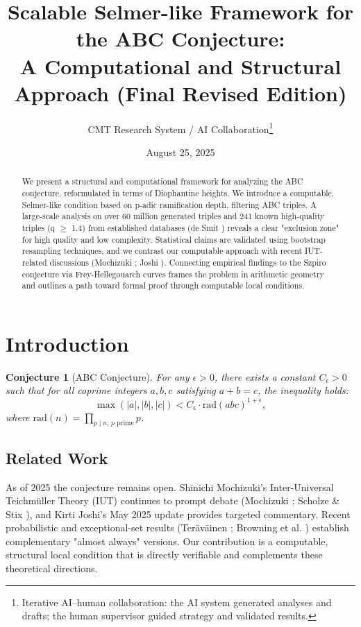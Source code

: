 \documentclass[11pt,a4paper]{article}
\title{Scalable Selmer-like Framework for the ABC Conjecture: \\ A Computational and Structural Approach (Final Revised Edition)}
\author{CMT Research System / AI Collaboration\thanks{Iterative AI--human collaboration: the AI system generated analyses and drafts; the human supervisor guided strategy and validated results.}}
\date{August 25, 2025}
\newtheorem{conjecture}{Conjecture}[section]
\newcommand{\rad}{\mathrm{rad}}
\begin{document}
\maketitle
\begin{abstract}
We present a structural and computational framework for analyzing the ABC conjecture, reformulated in terms of Diophantine heights. We introduce a computable, Selmer-like condition based on p-adic ramification depth, filtering ABC triples. A large-scale analysis on over 60 million generated triples and 241 known high-quality triples (q $\geq$ 1.4) from established databases (de Smit \cite{desmit}) reveals a clear "exclusion zone" for high quality and low complexity. Statistical claims are validated using bootstrap resampling techniques, and we contrast our computable approach with recent IUT-related discussions (Mochizuki \cite{mochizuki2021}; Joshi \cite{joshi2025}). Connecting empirical findings to the Szpiro conjecture via Frey-Hellegouarch curves frames the problem in arithmetic geometry and outlines a path toward formal proof through computable local conditions.
\end{abstract}
\tableofcontents
\bigskip

\section{Introduction}
\begin{conjecture}[ABC Conjecture]
For any $\epsilon > 0$, there exists a constant $C_\epsilon > 0$ such that for all coprime integers $a, b, c$ satisfying $a+b=c$, the inequality holds:
\[
    \max(|a|,|b|,|c|) < C_\epsilon \cdot \rad(abc)^{1+\epsilon},
\]
where $\rad(n) = \prod_{p\mid n,\, p \text{ prime}} p$.
\end{conjecture}
\subsection{Related Work}
As of 2025 the conjecture remains open. Shinichi Mochizuki's Inter-Universal Teichmüller Theory (IUT) continues to prompt debate (Mochizuki \cite{mochizuki2021}; Scholze \& Stix \cite{scholze2022}), and Kirti Joshi's May 2025 update \cite{joshi2025} provides targeted commentary. Recent probabilistic and exceptional-set results (Teräväinen \cite{teravainen2025}; Browning et al. \cite{browning2025}) establish complementary "almost always" versions. Our contribution is a computable, structural local condition that is directly verifiable and complements these theoretical directions.
\end{document}

